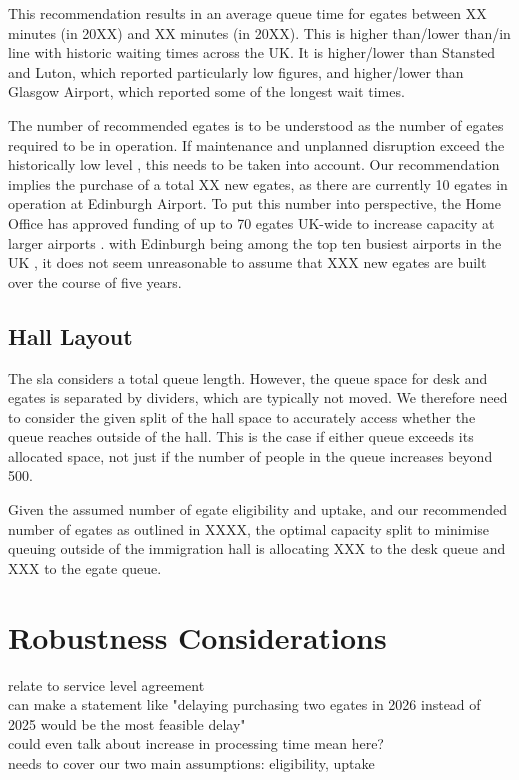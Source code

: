 \documentclass[10pt]{article}
\begin{document}
This recommendation results in an average queue time for \glspl{egate} between XX minutes (in 20XX) and XX minutes (in 20XX). This is higher than/lower than/in line with historic waiting times across the UK. It is higher/lower than Stansted and Luton, which reported particularly low figures, and higher/lower than Glasgow Airport, which reported some of the longest wait times. 

The number of recommended \glspl{egate} is to be understood as the number of \glspl{egate} required to be in operation. If maintenance and unplanned disruption exceed the historically low level \cite{Inspection_eGates}, this needs to be taken into account. Our recommendation implies the purchase of a total XX new \glspl{egate}, as there are currently 10 \glspl{egate} in operation at Edinburgh Airport. To put this number into perspective, the Home Office has approved funding of up to 70 \glspl{egate} UK-wide to increase capacity at larger airports \cite{Inspection_eGates}. with Edinburgh being among the top ten busiest airports in the UK \cite{busiestairport}, it does not seem unreasonable to assume that XXX new \glspl{egate} are built over the course of five years. 


\subsection{Hall Layout}
The \gls{sla} considers a total queue length. However, the queue space for desk and \glspl{egate} is separated by dividers, which are typically not moved. We therefore need to consider the given split of the hall space to accurately access whether the queue reaches outside of the hall. This is the case if either queue exceeds its allocated space, not just if the number of people in the queue increases beyond 500. 

Given the assumed number of \gls{egate} eligibility and uptake, and our recommended number of \glspl{egate} as outlined in XXXX, the optimal capacity split to minimise queuing outside of the immigration hall is allocating XXX to the desk queue and XXX to the \gls{egate} queue.
 

\section{Robustness Considerations} \label{sec:robustness}
relate to service level agreement \\
can make a statement like "delaying purchasing two egates in 2026 instead of 2025 would be the most feasible delay" \\
could even talk about increase in processing time mean here? \\
needs to cover our two main assumptions: eligibility, uptake
\end{document}
